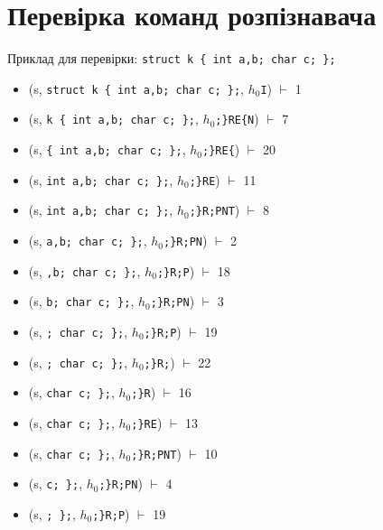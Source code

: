 \newcommand{\xvdash}[1]{$\stackrel{\text{#1}}{\vdash}$}

\newpage
\section{Перевірка команд розпізнавача}
Приклад для перевірки: \verb|struct k { int a,b; char c; };|
\begin{itemize}
    \item[]  (s, \quad \verb|struct k { int a,b; char c; };|,    \quad $h_{0}$\verb|I|)            $\vdash$ 1
    \item[]  (s, \quad \verb|k { int a,b; char c; };|,           \quad $h_{0}$\verb|;}RE{N|)       $\vdash$ 7
    \item[]  (s, \quad \verb|{ int a,b; char c; };|,             \quad $h_{0}$\verb|;}RE{|)        $\vdash$ 20
    \item[]  (s, \quad \verb|int a,b; char c; };|,               \quad $h_{0}$\verb|;}RE|)         $\vdash$ 11
    \item[]  (s, \quad \verb|int a,b; char c; };|,               \quad $h_{0}$\verb|;}R;PNT|)      $\vdash$ 8
    \item[]  (s, \quad \verb|a,b; char c; };|,                   \quad $h_{0}$\verb|;}R;PN|)       $\vdash$ 2
    \item[]  (s, \quad \verb|,b; char c; };|,                    \quad $h_{0}$\verb|;}R;P|)        $\vdash$ 18
    \item[]  (s, \quad \verb|b; char c; };|,                     \quad $h_{0}$\verb|;}R;PN|)       $\vdash$ 3
    \item[]  (s, \quad \verb|; char c; };|,                      \quad $h_{0}$\verb|;}R;P|)        $\vdash$ 19
    \item[]  (s, \quad \verb|; char c; };|,                      \quad $h_{0}$\verb|;}R;|)         $\vdash$ 22
    \item[]  (s, \quad \verb|char c; };|,                        \quad $h_{0}$\verb|;}R|)          $\vdash$ 16
    \item[]  (s, \quad \verb|char c; };|,                        \quad $h_{0}$\verb|;}RE|)         $\vdash$ 13
    \item[]  (s, \quad \verb|char c; };|,                        \quad $h_{0}$\verb|;}R;PNT|)      $\vdash$ 10
    \item[]  (s, \quad \verb|c; };|,                             \quad $h_{0}$\verb|;}R;PN|)       $\vdash$ 4
    \item[]  (s, \quad \verb|; };|,                              \quad $h_{0}$\verb|;}R;P|)        $\vdash$ 19

\end{itemize}
